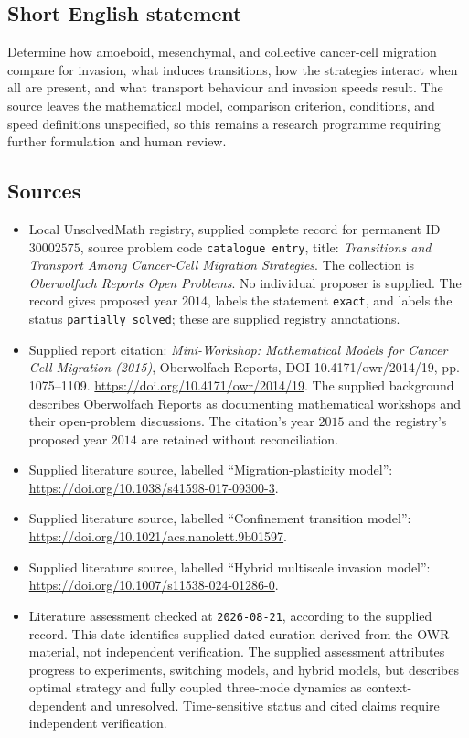 \documentclass[11pt]{article}
\begin{document}
\subsection{Short English statement}
Determine how amoeboid, mesenchymal, and collective cancer-cell migration compare for invasion, what induces transitions, how the strategies interact when all are present, and what transport behaviour and invasion speeds result. The source leaves the mathematical model, comparison criterion, conditions, and speed definitions unspecified, so this remains a research programme requiring further formulation and human review.
\subsection{Sources}
\begin{itemize}
\item Local UnsolvedMath registry, supplied complete record for permanent ID \(30002575\), source problem code \texttt{catalogue entry}, title: \emph{Transitions and Transport Among Cancer-Cell Migration Strategies}. The collection is \emph{Oberwolfach Reports Open Problems}. No individual proposer is supplied. The record gives proposed year \(2014\), labels the statement \texttt{exact}, and labels the status \texttt{partially\_solved}; these are supplied registry annotations.
\item Supplied report citation: \emph{Mini-Workshop: Mathematical Models for Cancer Cell Migration (2015)}, Oberwolfach Reports, DOI 10.4171/owr/2014/19, pp. 1075--1109. \url{https://doi.org/10.4171/owr/2014/19}. The supplied background describes Oberwolfach Reports as documenting mathematical workshops and their open-problem discussions. The citation's year \(2015\) and the registry's proposed year \(2014\) are retained without reconciliation.
\item Supplied literature source, labelled ``Migration-plasticity model'': \url{https://doi.org/10.1038/s41598-017-09300-3}.
\item Supplied literature source, labelled ``Confinement transition model'': \url{https://doi.org/10.1021/acs.nanolett.9b01597}.
\item Supplied literature source, labelled ``Hybrid multiscale invasion model'': \url{https://doi.org/10.1007/s11538-024-01286-0}.
\item Literature assessment checked at \texttt{2026-08-21}, according to the supplied record. This date identifies supplied dated curation derived from the OWR material, not independent verification. The supplied assessment attributes progress to experiments, switching models, and hybrid models, but describes optimal strategy and fully coupled three-mode dynamics as context-dependent and unresolved. Time-sensitive status and cited claims require independent verification.
\end{itemize}
\end{document}
